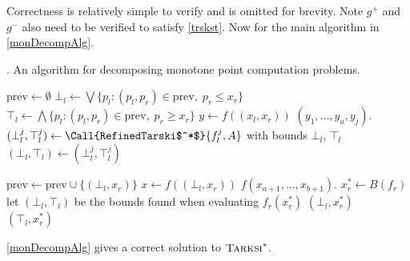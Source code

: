Correctness is relatively simple to verify and is omitted for brevity. Note
$g^+$ and $g^-$ also need to be verified to satisfy \cref{trskst}.
Now for the main algorithm in \cref{monDecompAlg}.
\begin{algorithm}[h]
  \caption{\citep{chenLi}. An algorithm for decomposing monotone point computation problems.} \label{monDecompAlg}
  \begin{algorithmic}[1]
    \State $\mathrm{prev} \gets \emptyset$
      \State $\bot_l \gets \bigvee\{p_l : (p_l, p_r) \in \mathrm{prev}, \; p_r \leq x_r \}$
      \State $\top_l \gets \bigwedge\{p_l : (p_l, p_r) \in \mathrm{prev}, \; p_r \geq x_r \}$
        \State $y \gets f((x_l, x_r))$
        \State \Return $(y_1, ..., y_a, y_j)$.
      \EndProcedure
      \State $(\bot_l^j, \top_l^j) \gets \Call{RefinedTarski$^*$}{f_l^j, A}$ with bounds $\bot_l$, $\top_l$
      \State $(\bot_l, \top_l) \gets (\bot_l^j, \top_l^j)$
      \EndFor

      \State $\mathrm{prev} \gets \mathrm{prev} \cup \{(\bot_l, x_r)\}$
      \State $x \gets f((\bot_l, x_r))$
      \State \Return $f(x_{a + 1}, ..., x_{b + 1})$.
    \EndProcedure
    \State $x_r^* \gets B(f_r)$
    \State let $(\bot_l, \top_l)$ be the bounds found when evaluating $f_r(x_r^*)$
     \Return $(\bot_l, x_r^*)$ \algorithmicelse\ \Return $(\top_l, x_r^*)$ \EndIf
  \EndProcedure
  \end{algorithmic}
\end{algorithm}
\begin{lemma}
  \cref{monDecompAlg} gives a correct solution to $\textsc{Tarksi}^*$.
\end{lemma}
